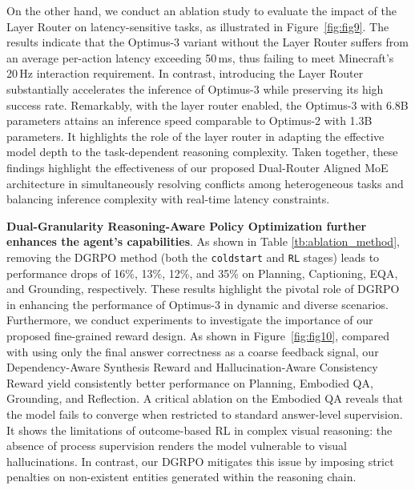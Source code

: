On the other hand, we conduct an ablation study to evaluate the impact of the Layer Router on latency-sensitive tasks, as illustrated in Figure~\ref{fig:fig9}. The results indicate that the Optimus-3 variant without the Layer Router suffers from an average per-action latency exceeding 50\,ms, thus failing to meet Minecraft's 20\,Hz interaction requirement. In contrast, introducing the Layer Router substantially accelerates the inference of Optimus-3 while preserving its high success rate. Remarkably, with the layer router enabled, the Optimus-3 with 6.8B parameters attains an inference speed comparable to Optimus-2 with 1.3B parameters. It highlights the role of the layer router in adapting the effective model depth to the task-dependent reasoning complexity. Taken together, these findings highlight the effectiveness of our proposed Dual-Router Aligned MoE architecture in simultaneously resolving conflicts among heterogeneous tasks and balancing inference complexity with real-time latency constraints.


\noindent\textbf{Dual-Granularity Reasoning-Aware Policy Optimization further enhances the agent’s capabilities}. As shown in Table \ref{tb:ablation_method}, removing the DGRPO method (both the \texttt{coldstart} and \texttt{RL} stages) leads to performance drops of 16\%, 13\%, 12\%, and 35\% on Planning, Captioning, EQA, and Grounding, respectively. These results highlight the pivotal role of DGRPO in enhancing the performance of Optimus-3 in dynamic and diverse scenarios. Furthermore, we conduct experiments to investigate the importance of our proposed fine-grained reward design. As shown in Figure~\ref{fig:fig10}, compared with using only the final answer correctness as a coarse feedback signal, our Dependency-Aware Synthesis Reward and Hallucination-Aware Consistency Reward yield consistently better performance on Planning, Embodied QA, Grounding, and Reflection. A critical ablation on the Embodied QA reveals that the model fails to converge when restricted to standard answer-level supervision. It shows the limitations of outcome-based RL in complex visual reasoning: the absence of process supervision renders the model vulnerable to visual hallucinations. In contrast, our DGRPO mitigates this issue by imposing strict penalties on non-existent entities generated within the reasoning chain. 






